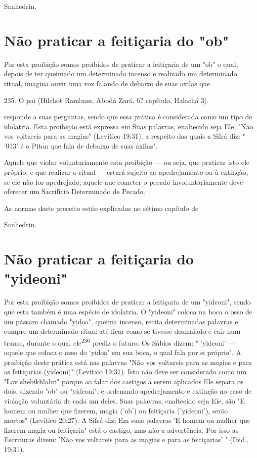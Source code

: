 \begin{itemize}
\begin{enumrate}
\begin{itemize}
\begin{itemize}
\begin{itemize}
Sanhedrin.

\section{Não praticar a feitiçaria do "ob"}


Por esta proibição somos proibidos de praticar a feitiçaria de um "ob" o
qual, depois de ter queimado um determinado incenso e realizado um
deter­minado ritual, imagina ouvir uma voz falando de debaixo de suas
axilas que

235. O pai (Hilchot Rambam, Abodá Zará, 6? capítulo, Halachá 3).


responde a suas perguntas, sendo que essa prática é considerada como um
tipo de idolatria. Esta proibição está expressa em Suas palavras,
enaltecido seja Ele, "Não vos voltareis para as magias" (Levítico
19:31), a respeito das quais a Sifrá diz: " '013' é o Piton que fala de
debaixo de suas axilas".

Aquele que violar voluntariamente esta proibição --- ou seja, que
pra­ticar isto ele próprio, e que realizar o ritual --- estará sujeito
ao apedrejamento ou à extinção, se ele não for apedrejado; aquele aue
cometer o pecado invo­luntariamente deve oferecer um Sacrifício
Determinado de Pecado.


As normas deste preceito estão explicadas no sétimo capítulo de


Sanhedrin.


\section{Não praticar a feitiçaria do "yideoni"}


Por esta proibição somos proibidos de praticar a feitiçaria de um
"yi­deoni", sendo que esta também é uma espécie de idolatria. O
"yideoni" colo­ca na boca o osso de um pássaro chamado "yidoa", queima
incenso, recita de­terminadas palavras e cumpre um determinado ritual
até ficar como se tivesse desmaiado e cair num transe, durante o qual
ele\textsuperscript{236} prediz o futuro. Os Sábios dizem: " 'yideoni'
--- aquele que coloca o osso do `yidoa' em sua boca, o qual fala por si
próprio". A proibição deste prática está nas palavras "Não vos
volta­reis para as magias e para as feitiçarias (yideoni)" (Levítico
19:31). Isto não deve ser considerado como um "Lav shebikhlalut" porque
ao falar dos castigos a serem aplicados Ele separa os dois, dizendo "ob"
ou "yideoni", e ordenando apedrejamento e extinção no caso de violação
voluntária de cada um deles. Suas palavras, enaltecido seja Ele, são "E
homem ou mulher que fizerem, magia ('ob') ou feitiçaria ('yideoni'),
serão mortos" (Levítico 20:27). A Sifrá diz: Em suas pa­lavras 'E homem
ou mulher que fizerem magia ou feitiçaria" está o castigo, mas não a
advertência. Por isso as Escrituras dizem: 'Não vos voltareis para as
ma­gias e para as feitiçarias' " (Ibid., 19:31).


\end{itemize}
\end{itemize}
\end{itemize}
\end{enumrate}
\end{itemize}
